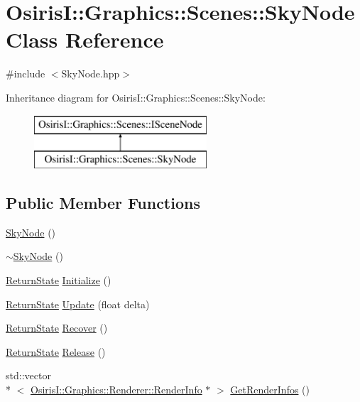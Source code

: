 \hypertarget{class_osiris_i_1_1_graphics_1_1_scenes_1_1_sky_node}{\section{Osiris\-I\-:\-:Graphics\-:\-:Scenes\-:\-:Sky\-Node Class Reference}
\label{class_osiris_i_1_1_graphics_1_1_scenes_1_1_sky_node}
}


{\ttfamily \#include $<$Sky\-Node.\-hpp$>$}

Inheritance diagram for Osiris\-I\-:\-:Graphics\-:\-:Scenes\-:\-:Sky\-Node\-:\begin{figure}[H]
\begin{center}
\leavevmode
\includegraphics[height=2.000000cm]{class_osiris_i_1_1_graphics_1_1_scenes_1_1_sky_node}
\end{center}
\end{figure}
\subsection*{Public Member Functions}
\begin{DoxyCompactItemize}
\item 
\hyperlink{class_osiris_i_1_1_graphics_1_1_scenes_1_1_sky_node_ad6a08fb0e314793a3a189c5ae61c8eef}{Sky\-Node} ()
\item 
\hyperlink{class_osiris_i_1_1_graphics_1_1_scenes_1_1_sky_node_ae7466fe20689a5080904ba74feb3261e}{$\sim$\-Sky\-Node} ()
\item 
\hyperlink{namespace_osiris_i_a8f53bf938dc75c65c6a529694514013e}{Return\-State} \hyperlink{class_osiris_i_1_1_graphics_1_1_scenes_1_1_sky_node_a654a4ac6182c7b4108bb55eafe43148d}{Initialize} ()
\item 
\hyperlink{namespace_osiris_i_a8f53bf938dc75c65c6a529694514013e}{Return\-State} \hyperlink{class_osiris_i_1_1_graphics_1_1_scenes_1_1_sky_node_a77319a0417bce031a24466622482b03d}{Update} (float delta)
\item 
\hyperlink{namespace_osiris_i_a8f53bf938dc75c65c6a529694514013e}{Return\-State} \hyperlink{class_osiris_i_1_1_graphics_1_1_scenes_1_1_sky_node_a298d68eab736d01c4d4f6e9a27374487}{Recover} ()
\item 
\hyperlink{namespace_osiris_i_a8f53bf938dc75c65c6a529694514013e}{Return\-State} \hyperlink{class_osiris_i_1_1_graphics_1_1_scenes_1_1_sky_node_abc8916f99fafe26bb3888df3e7c65309}{Release} ()
\item 
std\-::vector\\*
$<$ \hyperlink{struct_osiris_i_1_1_graphics_1_1_renderer_1_1_render_info}{Osiris\-I\-::\-Graphics\-::\-Renderer\-::\-Render\-Info} $\ast$ $>$ \hyperlink{class_osiris_i_1_1_graphics_1_1_scenes_1_1_sky_node_ae5968b0d3930df219d6a6c046281f5cf}{Get\-Render\-Infos} ()
\end{DoxyCompactItemize}
